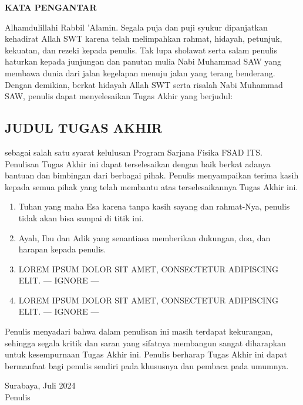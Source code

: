 \begin{center}
	\large{\textbf{KATA PENGANTAR}}
\end{center}
\indent Alhamdulillahi Rabbil 'Alamin. Segala puja dan puji syukur dipanjatkan kehadirat Allah SWT karena telah melimpahkan rahmat, hidayah, petunjuk, kekuatan, dan rezeki kepada penulis. Tak lupa sholawat serta salam penulis haturkan kepada junjungan dan panutan mulia Nabi Muhammad SAW yang membawa dunia dari jalan kegelapan menuju jalan yang terang benderang. Dengan demikian, berkat hidayah Allah SWT serta risalah Nabi Muhammad SAW, penulis dapat menyelesaikan Tugas Akhir yang berjudul:
\begin{center}
	\section*{JUDUL TUGAS AKHIR}
\end{center}
sebagai salah satu syarat kelulusan Program Sarjana Fisika FSAD ITS.\\
\indent Penulisan Tugas Akhir ini dapat terselesaikan dengan baik berkat adanya bantuan dan bimbingan dari berbagai pihak. Penulis menyampaikan terima kasih kepada semua pihak yang telah membantu atas terselesaikannya Tugas Akhir ini.
\begin{enumerate}
    \item Tuhan yang maha Esa karena tanpa kasih sayang dan rahmat-Nya, penulis tidak akan bisa sampai di titik ini.
    \item Ayah, Ibu dan Adik yang senantiasa memberikan dukungan, doa, dan harapan kepada penulis.
    \item LOREM IPSUM DOLOR SIT AMET, CONSECTETUR ADIPISCING ELIT. --- IGNORE ---
    \item LOREM IPSUM DOLOR SIT AMET, CONSECTETUR ADIPISCING ELIT. --- IGNORE ---
\end{enumerate}
Penulis menyadari bahwa dalam penulisan ini masih terdapat kekurangan, sehingga segala kritik dan saran yang sifatnya membangun sangat diharapkan untuk kesempurnaan Tugas Akhir ini. Penulis berharap  Tugas Akhir ini dapat bermanfaat bagi penulis sendiri pada khususnya dan pembaca pada umumnya.

\begin{flushright}
	Surabaya, Juli 2024\\
	\vspace{2cm}
	Penulis
\end{flushright}
